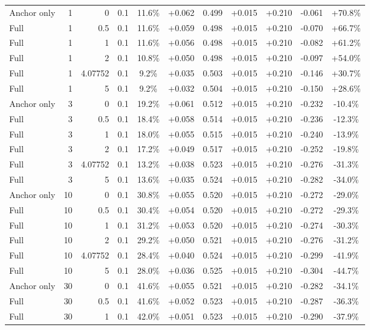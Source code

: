 \begin{table}[htbp]
\begin{tabular}{lrrrccccccc}
Anchor only & 1 & 0 & 0.1 & 11.6\% & +0.062 & 0.499 & +0.015 & +0.210 & -0.061 & +70.8\% \\
Full & 1 & 0.5 & 0.1 & 11.6\% & +0.059 & 0.498 & +0.015 & +0.210 & -0.070 & +66.7\% \\
Full & 1 & 1 & 0.1 & 11.6\% & +0.056 & 0.498 & +0.015 & +0.210 & -0.082 & +61.2\% \\
Full & 1 & 2 & 0.1 & 10.8\% & +0.050 & 0.498 & +0.015 & +0.210 & -0.097 & +54.0\% \\
Full & 1 & 4.07752 & 0.1 & 9.2\% & +0.035 & 0.503 & +0.015 & +0.210 & -0.146 & +30.7\% \\
Full & 1 & 5 & 0.1 & 9.2\% & +0.032 & 0.504 & +0.015 & +0.210 & -0.150 & +28.6\% \\
Anchor only & 3 & 0 & 0.1 & 19.2\% & +0.061 & 0.512 & +0.015 & +0.210 & -0.232 & -10.4\% \\
Full & 3 & 0.5 & 0.1 & 18.4\% & +0.058 & 0.514 & +0.015 & +0.210 & -0.236 & -12.3\% \\
Full & 3 & 1 & 0.1 & 18.0\% & +0.055 & 0.515 & +0.015 & +0.210 & -0.240 & -13.9\% \\
Full & 3 & 2 & 0.1 & 17.2\% & +0.049 & 0.517 & +0.015 & +0.210 & -0.252 & -19.8\% \\
Full & 3 & 4.07752 & 0.1 & 13.2\% & +0.038 & 0.523 & +0.015 & +0.210 & -0.276 & -31.3\% \\
Full & 3 & 5 & 0.1 & 13.6\% & +0.035 & 0.524 & +0.015 & +0.210 & -0.282 & -34.0\% \\
Anchor only & 10 & 0 & 0.1 & 30.8\% & +0.055 & 0.520 & +0.015 & +0.210 & -0.272 & -29.0\% \\
Full & 10 & 0.5 & 0.1 & 30.4\% & +0.054 & 0.520 & +0.015 & +0.210 & -0.272 & -29.3\% \\
Full & 10 & 1 & 0.1 & 31.2\% & +0.053 & 0.520 & +0.015 & +0.210 & -0.274 & -30.3\% \\
Full & 10 & 2 & 0.1 & 29.2\% & +0.050 & 0.521 & +0.015 & +0.210 & -0.276 & -31.2\% \\
Full & 10 & 4.07752 & 0.1 & 28.4\% & +0.040 & 0.524 & +0.015 & +0.210 & -0.299 & -41.9\% \\
Full & 10 & 5 & 0.1 & 28.0\% & +0.036 & 0.525 & +0.015 & +0.210 & -0.304 & -44.7\% \\
Anchor only & 30 & 0 & 0.1 & 41.6\% & +0.055 & 0.521 & +0.015 & +0.210 & -0.282 & -34.1\% \\
Full & 30 & 0.5 & 0.1 & 41.6\% & +0.052 & 0.523 & +0.015 & +0.210 & -0.287 & -36.3\% \\
Full & 30 & 1 & 0.1 & 42.0\% & +0.051 & 0.523 & +0.015 & +0.210 & -0.290 & -37.9\% \\

\end{tabular}
\end{table}

